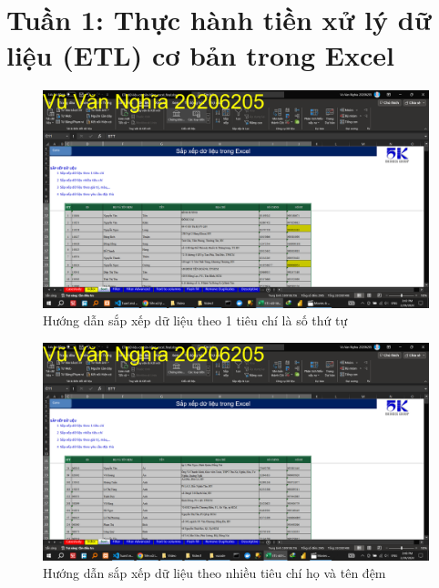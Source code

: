 \documentclass{article}
\begin{document}
\listoffigures
\section{Tuần 1: Thực hành tiền xử lý dữ liệu (ETL) cơ bản trong Excel}



\begin{figure}[h]
    \centering
    \includegraphics[scale = 0.15]{Video1/HuongDan/1.png}
    \caption{Hướng dẫn sắp xếp dữ liệu theo 1 tiêu chí là số thứ tự}
\end{figure}
\begin{figure}[h]
    \centering
    \includegraphics[scale = 0.15]{Video1/HuongDan/2.png}
    \caption{Hướng dẫn sắp xếp dữ liệu theo nhiều tiêu chí họ và tên đệm}
\end{figure}
\end{document}
